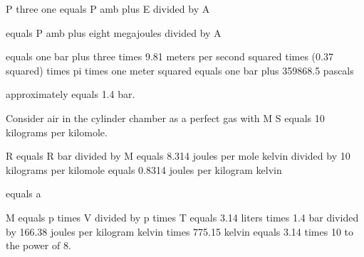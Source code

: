 P three one equals P amb plus E divided by A

equals P amb plus eight megajoules divided by A

equals one bar plus three times 9.81 meters per second squared times (0.37 squared) times pi times one meter squared equals one bar plus 359868.5 pascals

approximately equals 1.4 bar.

Consider air in the cylinder chamber as a perfect gas with M S equals 10 kilograms per kilomole.

R equals R bar divided by M equals 8.314 joules per mole kelvin divided by 10 kilograms per kilomole equals 0.8314 joules per kilogram kelvin

equals a

M equals p times V divided by p times T equals 3.14 liters times 1.4 bar divided by 166.38 joules per kilogram kelvin times 775.15 kelvin equals 3.14 times 10 to the power of 8.